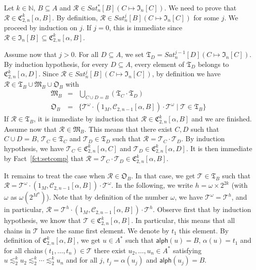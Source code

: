 \documentclass[envcountsame]{llncs}
\newcommand\nat{\ensuremath{\mathbb{N}}\xspace}
\newcommand\Cs{\ensuremath{\mathcal{C}}\xspace}
\newcommand\Cstwolen[1]{\ensuremath{\Cs_{2,#1}}\xspace}
\newcommand\fCgen[3]{\ensuremath{\fC_{#1,#3}^{#2}}\xspace}
\newcommand\Ts{\ensuremath{\mathcal{T}}\xspace}
\newcommand\Rs{\ensuremath{\mathcal{R}}\xspace}
\newcommand\sieq[2]{\ensuremath{\lesssim^{#1}_{#2}}\xspace}
\newcommand\ksieq[1]{\sieq{k}{#1}}
\newcommand\content[1]{\ensuremath{\contentmorphism(#1)}}
\newcommand\contentmorphism{\ensuremath{\textsf{alph}}}
\newcommand\chains{chains\xspace}
\newcommand\fI{\ensuremath{\mathfrak I}\xspace}
\newcommand\fM{\ensuremath{\mathfrak M}\xspace}
\newcommand\fC{\ensuremath{\mathfrak C}\xspace}
\newcommand\fO{\ensuremath{\mathfrak O}\xspace}
\newcommand\fT{\ensuremath{\mathfrak T}\xspace}
\begin{document}
Let $k \in \nat$, $B \subseteq A$ and $\Rs \in Sat^{*}_n[B](C \mapsto
\fI_n[C])$. We need to prove that $\Rs \in \fCgen2{k}{n}[\alpha,B]$. By
definition, $\Rs \in Sat^{j}_n[B](C \mapsto \fI_n[C])$ for some
$j$. We proceed by induction on $j$. If $j = 0$, this is immediate
since $\Rs \in \fI_n[B] \subseteq \fCgen2{k}{n}[\alpha,B]$.

Assume now that $j > 0$. For all $D \subseteq A$, we set $\fT_D =
Sat^{j-1}_n[D](C \mapsto \fI_n[C])$. By induction hypothesis, for every
$D\subseteq A$, every element of
$\fT_D$ belongs to $\fCgen2{k}{n}[\alpha,D]$.
Since $\Rs \in Sat^{j}_n[B](C \mapsto
\fI_n[C])$, by definition we have $\Rs \in
\fT_B \cup \fM_B \cup \fO_B$ with
\begin{eqnarray*}
  \fM_B & = & \bigcup_{C \cup D = B} (\fT_C \cdot \fT_D) \\
  \fO_B & = & \{\Ts^\omega \cdot (1_M,\Cstwolen{n-1}[\alpha,B]) \cdot
  \Ts^{\omega} \mid \Ts \in \fT_B\}
\end{eqnarray*}
If $\Rs \in \fT_B$, it is immediate by induction that $\Rs \in
\fCgen2{k}{n}[\alpha,B]$ and we are finished. Assume now that $\Rs \in
\fM_B$. This means that there exist $C,D$ such that $C \cup D =B$,
$\Ts_C \in \fT_C$ and $\Ts_D \in \fT_D$ such that $\Rs = \Ts_C \cdot
\Ts_D$. By induction hypothesis, we have $\Ts_C \in
\fCgen2{k}{n}[\alpha,C]$ and $\Ts_D \in \fCgen2{k}{n}[\alpha,D]$. It is
then immediate by Fact~\ref{fct:setcomp} that $\Rs = \Ts_C \cdot \Ts_D 
\in \fCgen2{k}{n}[\alpha,B]$.

It remains to treat the case when $\Rs \in \fO_B$. In that case, we
get $\Ts \in \fT_B$ such that $\Rs = \Ts^\omega \cdot
(1_M,\Cstwolen{n-1}[\alpha,B]) \cdot \Ts^{\omega}$. In the following, we
write $h = \omega \times 2^{2k}$ (with $\omega$ as
$\omega(2^{M^n})$). Note that by definition of the number $\omega$, we have
$\Ts^\omega = \Ts^h$, and in particular, $\Rs = \Ts^h \cdot
(1_M,\Cstwolen{n-1}[\alpha,B]) \cdot \Ts^{h}$. Observe first that by
induction hypothesis, we know that $\Ts \in \fCgen2{k}{n}[\alpha,B]$. In
particular, this means that all \chains in $\Ts$ have the same first
element. We denote by $t_1$ this element. By definition of
$\fCgen2{k}{n}[\alpha,B]$, we get $u \in A^*$ such that $\content{u} =
B$, $\alpha(u) = t_1$ and for all \chains $(t_1,\dots,t_n) \in \Ts$
there exist $u_2,\dots,u_n \in A^*$ satisfying $u \ksieq{2} u_2
\ksieq{2} \cdots \ksieq{2} u_n$ and for all $j$, $t_j=\alpha(u_j)$ and
$\content{u_j}=B$. 
\end{document}
